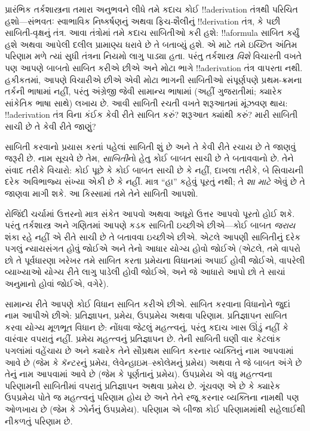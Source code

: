 \documentclass[../../../include/open-logic-section]{subfiles}
\begin{document}


પ્રારંભિક તર્કશાસ્ત્રના તમારા અનુભવને લીધે તમે કદાચ કોઈ
!!a{derivation} તંત્રથી પરિચિત હશો---સંભવતઃ સ્વાભાવિક નિષ્કર્ષણનું
અથવા ફિચ-શૈલીનું !!{derivation} તંત્ર, કે પછી સાબિતી-વૃક્ષનું તંત્ર.
આવા તંત્રોમાં તમે કદાચ સાબિતીઓ કરી હશે: !!a{formula} સાબિત કર્યું
હશે અથવા આપેલી દલીલ પ્રામાણ્ય ધરાવે છે તે બતાવ્યું હશે. એ માટે તમે
ઇચ્છિત અંતિમ પરિણામ મળે ત્યાં સુધી તંત્રના નિયમો લાગુ પાડ્યા હતા.
પરંતુ તર્કશાસ્ત્ર \emph{વિશે} વિચારતી વખતે પણ આપણે બાબતો સાબિત કરીએ
છીએ અને મોટા ભાગે !!a{derivation} તંત્ર વાપરતા નથી. હકીકતમાં, આપણે
વિચારીએ છીએ એવી મોટા ભાગની સાબિતીઓ સંપૂર્ણપણે પ્રથમ-ક્રમના તર્કની
ભાષામાં નહીં, પરંતુ અંગ્રેજી જેવી સામાન્ય ભાષામાં (અહીં ગુજરાતીમાં;
ક્યારેક સાંકેતિક ભાષા સાથે) લખાય છે. આવી સાબિતી રચતી વખતે શરૂઆતમાં
મૂંઝવણ થાય: !!a{derivation} તંત્ર વિના કંઈક કેવી રીતે સાબિત કરું?
શરૂઆત ક્યાંથી કરું? મારી સાબિતી સાચી છે તે કેવી રીતે જાણું?

સાબિતી કરવાનો પ્રયાસ કરતાં પહેલાં સાબિતી શું છે અને તે કેવી રીતે
રચાય છે તે જાણવું જરૂરી છે. નામ સૂચવે છે તેમ, \emph{સાબિતી}નો
હેતુ કોઈ બાબત સાચી છે તે બતાવવાનો છે. તેને સંવાદ તરીકે વિચારો:
કોઈ પૂછે કે કોઈ બાબત સાચી છે કે નહીં, દાખલા તરીકે, બે સિવાયની
દરેક અવિભાજ્ય સંખ્યા એકી છે કે નહીં. માત્ર ``હા'' કહેવું પૂરતું
નથી; તે \emph{શા માટે} એવું છે તે જાણવા માગી શકે. આ કિસ્સામાં તમે
તેને સાબિતી આપશો.

રોજિંદી ચર્ચામાં ઉત્તરનો માત્ર સંકેત આપવો અથવા અધૂરો ઉત્તર આપવો
પૂરતો હોઈ શકે. પરંતુ તર્કશાસ્ત્ર અને ગણિતમાં આપણે કડક સાબિતી
ઇચ્છીએ છીએ---કોઈ બાબત \emph{જરાય} શંકા રહે નહીં એ રીતે સાચી છે તે
બતાવવા ઇચ્છીએ છીએ. એટલે આપણી સાબિતીનું દરેક પગલું ન્યાયસંગત હોવું
જોઈએ અને તેનો આધાર યોગ્ય હોવો જોઈએ (એટલે, તમે વાપરો છો તે
પૂર્વધારણા ખરેખર તમે સાબિત કરતા પ્રમેયના વિધાનમાં અપાઈ હોવી જોઈએ,
વાપરેલી વ્યાખ્યાઓ યોગ્ય રીતે લાગુ પાડેલી હોવી જોઈએ, અને જે
આધારો આપો છો તે સાચાં અનુમાનો હોવાં જોઈએ, વગેરે).

સામાન્ય રીતે આપણે કોઈ વિધાન સાબિત કરીએ છીએ. સાબિત કરવાના
વિધાનોને જુદાં નામ આપીએ છીએ: પ્રતિજ્ઞાપન, પ્રમેય, ઉપપ્રમેય અથવા
પરિણામ. પ્રતિજ્ઞાપન સાબિત કરવા યોગ્ય મૂળભૂત વિધાન છે: નોંધવા જેટલું
મહત્ત્વનું, પરંતુ કદાચ ખાસ ઊંડું નહીં કે વારંવાર વપરાતું નહીં.
પ્રમેય મહત્ત્વનું પ્રતિજ્ઞાપન છે. તેની સાબિતી ઘણી વાર કેટલાંક
પગલાંમાં વહેંચાય છે અને ક્યારેક તેને સૌપ્રથમ સાબિત કરનાર વ્યક્તિનું
નામ આપવામાં આવે છે (જેમ કે કૅન્ટરનું પ્રમેય, લેવેન્હાઇમ--સ્કોલેમનું
પ્રમેય) અથવા તે જે બાબત અંગે છે તેનું નામ આપવામાં આવે છે (જેમ કે
પૂર્ણતાનું પ્રમેય). ઉપપ્રમેય એ વધુ મહત્ત્વના પરિણામની સાબિતીમાં
વપરાતું પ્રતિજ્ઞાપન અથવા પ્રમેય છે. ગૂંચવણ એ છે કે ક્યારેક ઉપપ્રમેય
પોતે જ મહત્ત્વનું પરિણામ હોય છે અને તેને રજૂ કરનાર વ્યક્તિના નામથી
પણ ઓળખાય છે (જેમ કે ઝોર્નનું ઉપપ્રમેય). પરિણામ એ બીજા કોઈ પરિણામમાંથી
સહેલાઈથી નીકળતું પરિણામ છે.
\end{document}
